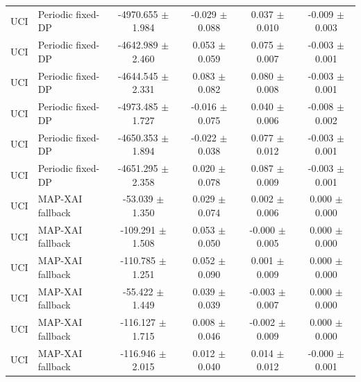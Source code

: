 \begin{table}[t]
\begin{tabular}{llcccc}
UCI & Periodic fixed-DP & -4970.655 $\pm$ 1.984 & -0.029 $\pm$ 0.088 & 0.037 $\pm$ 0.010 & -0.009 $\pm$ 0.003 \\
UCI & Periodic fixed-DP & -4642.989 $\pm$ 2.460 & 0.053 $\pm$ 0.059 & 0.075 $\pm$ 0.007 & -0.003 $\pm$ 0.001 \\
UCI & Periodic fixed-DP & -4644.545 $\pm$ 2.331 & 0.083 $\pm$ 0.082 & 0.080 $\pm$ 0.008 & -0.003 $\pm$ 0.001 \\
UCI & Periodic fixed-DP & -4973.485 $\pm$ 1.727 & -0.016 $\pm$ 0.075 & 0.040 $\pm$ 0.006 & -0.008 $\pm$ 0.002 \\
UCI & Periodic fixed-DP & -4650.353 $\pm$ 1.894 & -0.022 $\pm$ 0.038 & 0.077 $\pm$ 0.012 & -0.003 $\pm$ 0.001 \\
UCI & Periodic fixed-DP & -4651.295 $\pm$ 2.358 & 0.020 $\pm$ 0.078 & 0.087 $\pm$ 0.009 & -0.003 $\pm$ 0.001 \\
UCI & MAP-XAI fallback & -53.039 $\pm$ 1.350 & 0.029 $\pm$ 0.074 & 0.002 $\pm$ 0.006 & 0.000 $\pm$ 0.000 \\
UCI & MAP-XAI fallback & -109.291 $\pm$ 1.508 & 0.053 $\pm$ 0.050 & -0.000 $\pm$ 0.005 & 0.000 $\pm$ 0.000 \\
UCI & MAP-XAI fallback & -110.785 $\pm$ 1.251 & 0.052 $\pm$ 0.090 & 0.001 $\pm$ 0.009 & 0.000 $\pm$ 0.000 \\
UCI & MAP-XAI fallback & -55.422 $\pm$ 1.449 & 0.039 $\pm$ 0.039 & -0.003 $\pm$ 0.007 & 0.000 $\pm$ 0.000 \\
UCI & MAP-XAI fallback & -116.127 $\pm$ 1.715 & 0.008 $\pm$ 0.046 & -0.002 $\pm$ 0.009 & 0.000 $\pm$ 0.000 \\
UCI & MAP-XAI fallback & -116.946 $\pm$ 2.015 & 0.012 $\pm$ 0.040 & 0.014 $\pm$ 0.012 & -0.000 $\pm$ 0.001 \\
\bottomrule
\end{tabular}
\end{table}
